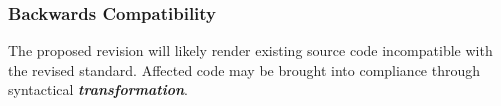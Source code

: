\documentclass[10pt,a4paper,leqno,fleqn]{article}
\renewcommand{\emph}[1]{\textbf{\textit{#1}}}
\begin{document}
\subsubsection{Backwards Compatibility}

The proposed revision will likely render existing source code incompatible with
the revised standard. Affected code may be brought into compliance through
syntactical \emph{transformation}.


\printglossary[title=Definitions, toctitle=Definitions]




\end{document}
